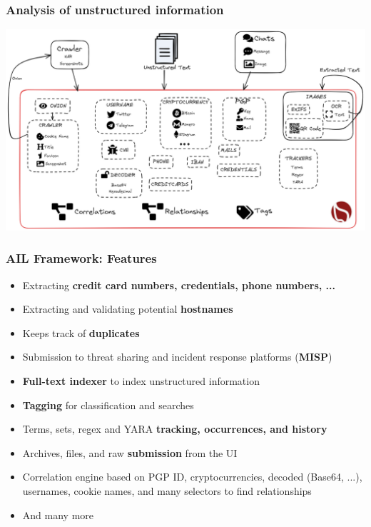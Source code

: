 \documentclass[10pt,aspectratio=169, colorlinks=true, linkcolor=circlBlue]{beamer}
\begin{document}
\begin{frame}
    \frametitle{Analysis of unstructured information}
    \begin{center}
        \includegraphics[scale=0.225]{images/ail-internal.png}
    \end{center}
\end{frame}

\begin{frame}
    \frametitle{AIL Framework: Features}
    \begin{itemize}
        \item Extracting \textbf{credit card numbers, credentials, phone numbers, ...}
        \item Extracting and validating potential \textbf{hostnames}
        \item Keeps track of \textbf{duplicates}
        \item Submission to threat sharing and incident response platforms (\textbf{MISP}) %
        \item \textbf{Full-text indexer} to index unstructured information
        \item \textbf{Tagging} for classification and searches
        \item Terms, sets, regex and YARA \textbf{tracking, occurrences, and history}
        \item Archives, files, and raw \textbf{submission} from the UI
        \item Correlation engine based on PGP ID, cryptocurrencies, decoded (Base64, ...), usernames, cookie names, and many selectors to find relationships
        \item And many more
    \end{itemize}
\end{frame}
\end{document}
